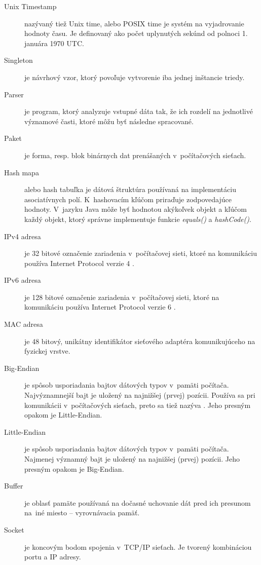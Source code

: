 \documentclass[]{tukediphc}
\begin{document}
\begin{description}
	\item[Unix Timestamp] nazývaný tiež Unix time, alebo POSIX time je systém na vyjadrovanie 
	hodnoty času. Je definovaný ako počet uplynutých sekúnd od polnoci 1. januára 1970 UTC.
	
	\item[Singleton] je návrhový vzor, ktorý povoľuje vytvorenie iba jednej inštancie triedy. 
	
	\item[Parser] je program, ktorý analyzuje vstupné dáta tak, že ich rozdelí na jednotlivé 
	významové časti, ktoré môžu byť následne spracované. \citep{veri}
	
	\item[Paket] je forma, resp. blok binárnych dat prenášaných v~počítačových sieťach.
	
	\item[Hash mapa] alebo hash tabuľka je dátová štruktúra používaná na implementáciu asociatívnych 
	polí. K~hashovacím kľúčom priraďuje zodpovedajúce hodnoty. V~jazyku Java môže byť hodnotou 
	akýkoľvek objekt a kľúčom každý objekt, ktorý správne implementuje funkcie \emph{equals()} a 
	\emph{hashCode()}.
	
	\item[IPv4 adresa] je 32 bitové označenie zariadenia v~počítačovej sieti, ktoré na komunikáciu 
	používa Internet Protocol verzie 4 \citep{rfc791}.
	
	\item[IPv6 adresa] je 128 bitové označenie zariadenia v~počítačovej sieti, ktoré na komunikáciu 
	používa Internet Protocol verzie 6 \citep{rfc2460}.
	
	\item[MAC adresa] je 48 bitový, unikátny identifikátor sieťového adaptéra komunikujúceho na 
	fyzickej vrstve. 
	
	\item[Big-Endian] je spôsob usporiadania bajtov dátových typov v~pamäti počítača. Najvýznamnejší 
	bajt je uložený na najnižšej (prvej) pozícii. Používa sa pri komunikácii v~počítačových sieťach,
	preto sa tiež nazýva . Jeho presným opakom je Little-Endian.
	
	\item[Little-Endian] je spôsob usporiadania bajtov dátových typov v~pamäti počítača. Najmenej 
	významný bajt je uložený na najnižšej (prvej) pozícii. Jeho presným opakom je Big-Endian.
	
	\item[Buffer] je oblasť pamäte používaná na dočasné uchovanie dát pred ich presunom na~iné 
	miesto -- vyrovnávacia pamäť.
	
	\item[Socket] je koncovým bodom spojenia v~TCP/IP sieťach. Je tvorený kombináciou portu a IP 
	adresy. \citep{linktionary} 
\end{description}

\kslovnikterminov
%
\pagestyle{headings}

%

%

%
%
%
%
%

%

%

%

%

%

%
\end{document}
